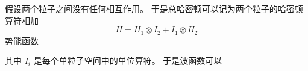 
\begin{issues}
\issueDraft
\end{issues}


假设两个粒子之间没有任何相互作用。 于是总哈密顿可以记为两个粒子的哈密顿算符相加
\begin{equation}
H = H_1 \otimes I_2 + I_1 \otimes H_2
\end{equation}
势能函数

其中 $I_i$ 是每个单粒子空间中的单位算符。 于是波函数可以


